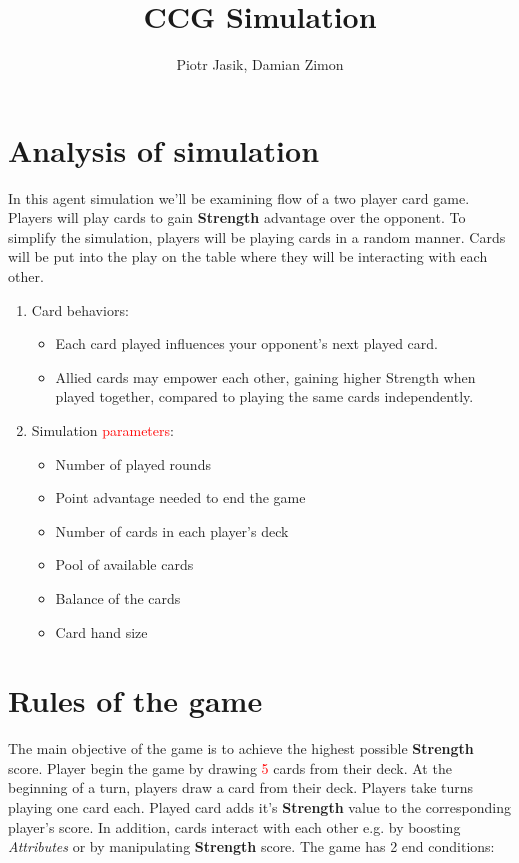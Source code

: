 \documentclass{article}
\title{CCG Simulation}
\author{Piotr Jasik, Damian Zimon}
\begin{document}
\maketitle

\clearpage

\section{Analysis of simulation}
In this agent simulation we'll be examining flow of a two player card game. Players will play cards to gain \textbf{Strength} advantage over the opponent. To simplify the simulation, players will be playing cards in a random manner. Cards will be put into the play on the table where they will be interacting with each other.
\begin{enumerate}
    \item Card behaviors:
    \begin{itemize}
        \item Each card played influences your opponent's next played card.
        \item Allied cards may empower each other, gaining higher Strength when played together, compared to playing the same cards independently.
    \end{itemize}
    \item Simulation \textcolor{red}{parameters}:
    \begin{itemize}
        \item Number of played rounds
        \item Point advantage needed to end the game
        \item Number of cards in each player's deck
        \item Pool of available cards
        \item Balance of the cards
        \item Card hand size
    \end{itemize}
\end{enumerate}
\section{Rules of the game}

    The main objective of the game is to achieve the highest possible \textbf{Strength} score. 
    Player begin the game by drawing \textcolor{red}{5} cards from their deck.
    At the beginning of a turn, players draw a card from their deck.
    Players take turns playing one card each.
    Played card adds it's \textbf{Strength} value to the corresponding player's score. 
    In addition, cards interact with each other e.g. by boosting \textit{Attributes} or by manipulating \textbf{Strength} score. 
    The game has 2 end conditions: 
    
\end{document}

